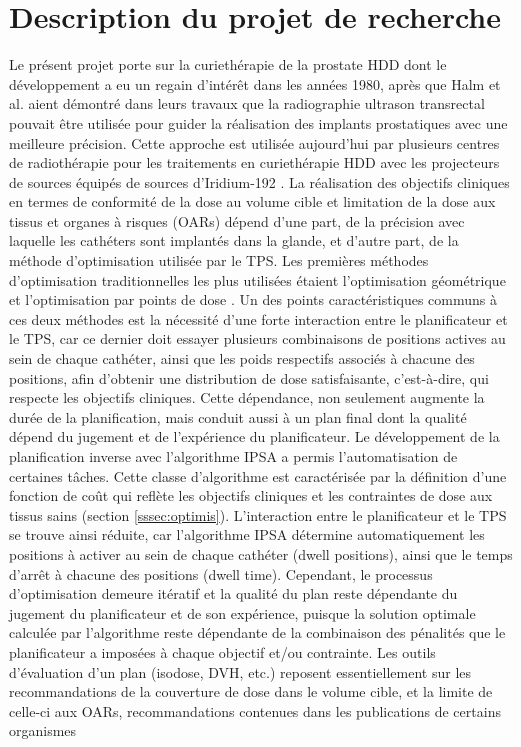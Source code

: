 \section{Description du projet de recherche}
Le présent projet porte sur la curiethérapie de la prostate HDD dont le développement a eu un regain d’intérêt dans les années 1980, après que Halm et al. \cite{Holm2002} aient démontré dans leurs travaux que la radiographie ultrason transrectal pouvait être utilisée pour guider la réalisation des implants prostatiques avec une meilleure précision. Cette approche est utilisée aujourd’hui par plusieurs centres de radiothérapie pour les traitements en curiethérapie HDD avec les projecteurs de sources équipés de sources d’Iridium-192 \cite{Stromberg, Mate, Borghede, Hoskin, Demanes, Blasko}. La réalisation des objectifs cliniques en termes de conformité de la dose au volume cible et limitation de la dose aux tissus et organes à risques (OARs)  dépend d’une part, de la précision avec laquelle les cathéters sont implantés dans la glande, et d’autre part, de la méthode d’optimisation utilisée par le TPS. Les premières méthodes d’optimisation traditionnelles les plus utilisées étaient l’optimisation géométrique et l’optimisation par points de dose \cite{Ezzel, Thomadsen, Edmundson1, Edmundson2}. Un des points caractéristiques communs à ces deux méthodes est la nécessité d’une forte interaction entre le planificateur et le TPS,  car ce dernier doit essayer plusieurs combinaisons de positions actives au sein de chaque cathéter, ainsi que les poids respectifs associés à chacune des positions, afin d’obtenir une distribution de dose satisfaisante, c’est-à-dire, qui respecte les objectifs cliniques. Cette dépendance, non seulement augmente la durée de la planification, mais conduit aussi à un plan final dont la qualité dépend du jugement et de l’expérience du planificateur. Le développement de la planification inverse avec l’algorithme IPSA \cite{ELessard, LessardP, Lessard2004} a permis l’automatisation de certaines tâches. Cette classe d’algorithme est caractérisée par la définition d’une fonction de coût qui reflète les objectifs cliniques et les contraintes de dose aux tissus sains (section \ref{sssec:optimis}). L’interaction entre le planificateur et le TPS se trouve ainsi réduite, car l’algorithme IPSA détermine automatiquement les positions à activer au sein de chaque cathéter (dwell positions), ainsi que le temps d’arrêt à chacune des positions (dwell time). Cependant, le processus d’optimisation demeure itératif et la qualité du plan reste dépendante du jugement du planificateur et de son expérience, puisque la solution optimale calculée par l’algorithme reste dépendante de la combinaison des pénalités que le planificateur a imposées à chaque objectif et/ou contrainte. Les outils d’évaluation d’un plan (isodose, DVH, etc.)  reposent essentiellement sur les recommandations de la couverture de dose dans le volume cible, et la limite de celle-ci aux OARs, recommandations contenues dans les publications de certains organismes 